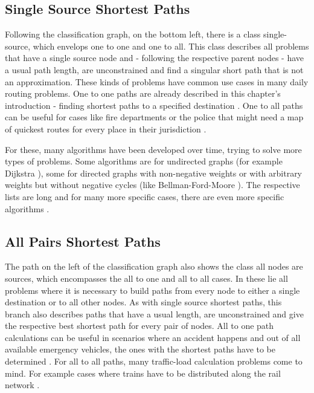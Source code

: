 \subsection{Single Source Shortest Paths}
Following the classification graph, on the bottom left, there is a class \glqq single-source\grqq, which envelops one to one and one to all.
This class describes all problems that have a single source node and - following the respective parent nodes - have a usual path length, are unconstrained and find a singular short path that is not an approximation.
These kinds of problems have common use cases in many daily routing problems. 
One to one paths are already described in this chapter's introduction - finding shortest paths to a specified destination \cite{sanders_shortest_2019}.
One to all paths can be useful for cases like fire departments or the police that might need a map of quickest routes for every place in their jurisdiction \cite{sanders_shortest_2019}.

For these, many algorithms have been developed over time, trying to solve more types of problems. 
Some algorithms are for undirected graphs (for example Dijkstra \cite{wayahdi_greedy_2021}), some for directed graphs with non-negative weights or with arbitrary weights but without negative cycles (like Bellman-Ford-Moore \cite{cherkassky_shortest_1996}).
The respective lists are long and for many more specific cases, there are even more specific algorithms \cite{deo_shortest-path_1984, madkour_survey_2017}. 



\subsection{All Pairs Shortest Paths}
The path on the left of the classification graph also shows the class \glqq all nodes are sources\grqq, which encompasses the all to one and all to all cases. 
In these lie all problems where it is necessary to build paths from every node to either a single destination or to all other nodes.
As with single source shortest paths, this branch also describes paths that have a usual length, are unconstrained and give the respective best shortest path for every pair of nodes. 
All to one path calculations can be useful in scenarios where an accident happens and out of all available emergency vehicles, the ones with the shortest paths have to be determined \cite{khamayseh_efficient_2015}.
For all to all paths, many traffic-load calculation problems come to mind. 
For example cases where trains have to be distributed along the rail network \cite{curtis_rewire_2012}.


